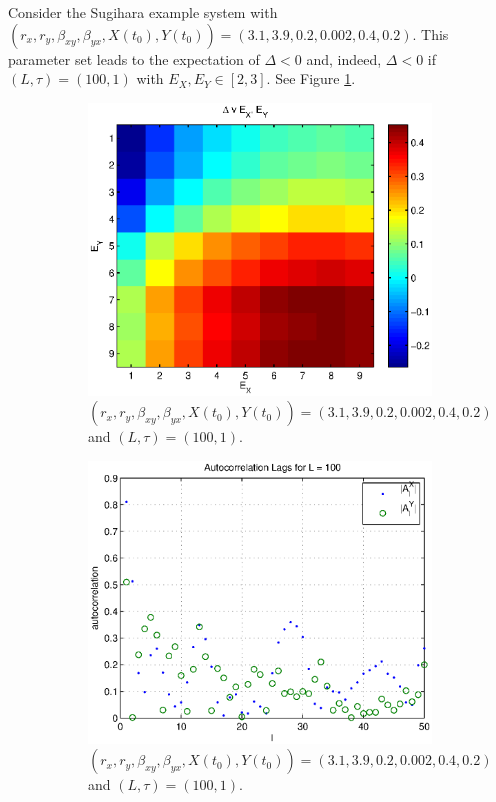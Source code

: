 \documentclass[a4paper,11pt]{article}
\begin{document}
Consider the Sugihara example system with $\left(r_x,r_y,\beta_{xy},\beta_{yx},X(t_0),Y(t_0)\right) = \left(3.1,3.9,0.2,0.002,0.4,0.2\right)$.  This parameter set leads to the expectation of $\Delta<0$ and, indeed, $\Delta<0$ if $(L,\tau)=(100,1)$ with $E_X,E_Y\in[2,3]$.  See Figure \ref{fig:SugEx2VaryE}.
\begin{figure}[h!t]
\centering
\begin{subfigure}[b]{0.4\textwidth}
\label{fig:SugEx2VaryE}
\includegraphics[scale=0.55]{graphics/SugEx2VaryE.eps}
\caption{$\left(r_x,r_y,\beta_{xy},\beta_{yx},X(t_0),Y(t_0)\right) = \left(3.1,3.9,0.2,0.002,0.4,0.2\right)$ and $\left(L,\tau\right) = \left(100,1\right)$.}
\end{subfigure}
\begin{subfigure}[b]{0.4\textwidth}
\label{fig:SugEx2VaryEauto}
\includegraphics[scale=0.55]{graphics/SugEx2VaryEauto.eps}
\caption{$\left(r_x,r_y,\beta_{xy},\beta_{yx},X(t_0),Y(t_0)\right) = \left(3.1,3.9,0.2,0.002,0.4,0.2\right)$ and $\left(L,\tau\right) = \left(100,1\right)$.}
\end{subfigure}
\caption{}
\end{figure}
\end{document}
